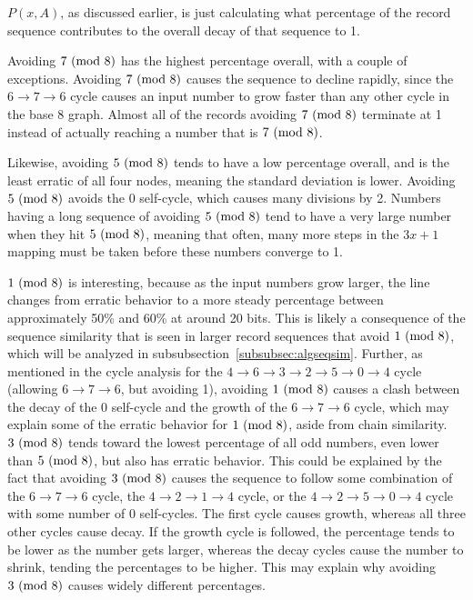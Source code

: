 $P(x,A)$, as discussed earlier, is just calculating what percentage of the record sequence contributes to the overall decay of that sequence to 1. \par
Avoiding $7 \ (\mathrm{mod}\ 8)$ has the highest percentage overall, with a couple of exceptions. Avoiding $7 \ (\mathrm{mod}\ 8)$ causes the sequence to decline rapidly, since the $6 \rightarrow 7 \rightarrow 6$ cycle causes an input number to grow faster than any other cycle in the base 8 graph. Almost all of the records avoiding $7 \ (\mathrm{mod}\ 8)$ terminate at 1 instead of actually reaching a number that is $7 \ (\mathrm{mod}\ 8)$. \par
Likewise, avoiding $5 \ (\mathrm{mod}\ 8)$ tends to have a low percentage overall, and is the least erratic of all four nodes, meaning the standard deviation is lower. Avoiding $5 \ (\mathrm{mod}\ 8)$ avoids the 0 self-cycle, which causes many divisions by 2. Numbers having a long sequence of avoiding $5 \ (\mathrm{mod}\ 8)$ tend to have a very large number when they hit $5 \ (\mathrm{mod}\ 8)$, meaning that often, many more steps in the $3x+1$ mapping must be taken before these numbers converge to 1. \par
$1 \ (\mathrm{mod}\ 8)$ is interesting, because as the input numbers grow larger, the line changes from erratic behavior to a more steady percentage between approximately 50\% and 60\% at around 20 bits. This is likely a consequence of the sequence similarity that is seen in larger record sequences that avoid $1 \ (\mathrm{mod}\ 8)$, which will be analyzed in subsubsection~\ref{subsubsec:algseqsim}. Further, as mentioned in the cycle analysis for the $4 \rightarrow 6 \rightarrow 3 \rightarrow 2 \rightarrow 5 \rightarrow 0 \rightarrow 4$ cycle (allowing $6 \rightarrow 7 \rightarrow 6$, but avoiding 1), avoiding $1\ (\mathrm{mod}\ 8)$ causes a clash between the decay of the 0 self-cycle and the growth of the $6 \rightarrow 7 \rightarrow 6$ cycle, which may explain some of the erratic behavior for $1\ (\mathrm{mod}\ 8)$, aside from chain similarity.
$3 \ (\mathrm{mod}\ 8)$ tends toward the lowest percentage of all odd numbers, even lower than $5 \ (\mathrm{mod}\ 8)$, but also has erratic behavior. This could be explained by the fact that avoiding $3 \ (\mathrm{mod}\ 8)$ causes the sequence to follow some combination of the $6 \rightarrow 7 \rightarrow 6$ cycle, the $4 \rightarrow 2 \rightarrow 1 \rightarrow 4$ cycle, or the $4 \rightarrow 2 \rightarrow 5 \rightarrow 0 \rightarrow 4$ cycle with some number of $0$ self-cycles. The first cycle causes growth, whereas all three other cycles cause decay. If the growth cycle is followed, the percentage tends to be lower as the number gets larger, whereas the decay cycles cause the number to shrink, tending the percentages to be higher. This may explain why avoiding $3 \ (\mathrm{mod}\ 8)$ causes widely different percentages.
